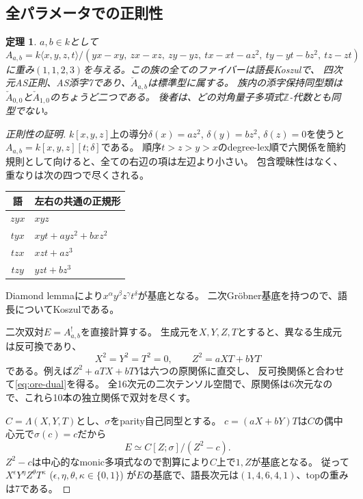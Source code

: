\documentclass[11pt,a4paper]{ltjsarticle}
\newtheorem{theorem}{定理}[section]
\theoremstyle{definition}
\newcommand{\ZZ}{\mathbb Z}
\begin{document}
\subsection{全パラメータでの正則性}
\begin{theorem}\label{thm:ore}
$a,b\in k$として
\[
A_{a,b}=k\langle x,y,z,t\rangle/
\left(yx-xy,\ zx-xz,\ zy-yz,\ tx-xt-az^2,\ ty-yt-bz^2,\ tz-zt\right)
\]
に重み$(1,1,2,3)$を与える。この族の全てのファイバーは語長Koszulで、
四次元AS正則、AS添字7であり、$\check A_{a,b}$は標準型に属する。
族内の添字保持同型類は$\check A_{0,0}$と$\check A_{1,0}$のちょうど二つである。
後者は、どの対角量子多項式$\ZZ$-代数とも同型でない。
\end{theorem}
\begin{proof}[正則性の証明]
$k[x,y,z]$上の導分$\delta(x)=az^2$, $\delta(y)=bz^2$, $\delta(z)=0$を使うと
$A_{a,b}=k[x,y,z][t;\delta]$である。
順序$t>z>y>x$のdegree-lex順で六関係を簡約規則として向けると、全ての右辺の項は左辺より小さい。
包含曖昧性はなく、重なりは次の四つで尽くされる。
\begin{center}
\begin{tabular}{c|l}
\toprule
語 & 左右の共通の正規形\\
\midrule
$zyx$ & $xyz$\\
$tyx$ & $xyt+ayz^2+bxz^2$\\
$tzx$ & $xzt+az^3$\\
$tzy$ & $yzt+bz^3$\\
\bottomrule
\end{tabular}
\end{center}
Diamond lemma\cite[Theorem 1.2]{Bergman}により$x^\alpha y^\beta z^\gamma t^\delta$が基底となる。
二次Gr\"obner基底を持つので、語長についてKoszulである\cite[Theorem 5.3]{Priddy}。

二次双対$E=A_{a,b}^!$を直接計算する。
生成元を$X,Y,Z,T$とすると、異なる生成元は反可換であり、
\begin{equation}\label{eq:ore-dual}
X^2=Y^2=T^2=0,\qquad Z^2=aXT+bYT
\end{equation}
である。例えば$Z^2+aTX+bTY$は六つの原関係に直交し、
反可換関係と合わせて\eqref{eq:ore-dual}を得る。
全16次元の二次テンソル空間で、原関係は6次元なので、これら10本の独立関係で双対を尽くす。

$C=\Lambda(X,Y,T)$とし、$\sigma$をparity自己同型とする。
$c=(aX+bY)T$は$C$の偶中心元で$\sigma(c)=c$だから
\[
E\simeq C[Z;\sigma]/(Z^2-c).
\]
$Z^2-c$は中心的なmonic多項式なので割算により$C$上で$1,Z$が基底となる。
従って
$X^\epsilon Y^\eta Z^\theta T^\kappa$ ($\epsilon,\eta,\theta,\kappa\in\{0,1\}$)
が$E$の基底で、語長次元は$(1,4,6,4,1)$、topの重みは7である。


\end{proof}
\end{document}
